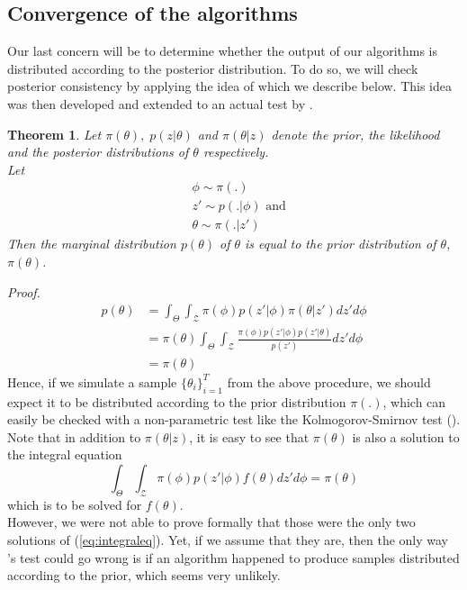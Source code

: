 \documentclass[11pt,a4paper]{report}\usepackage[]{graphicx}\usepackage[]{color}
\newtheorem{theorem}{Theorem}[section]
\begin{document}
\subsection{Convergence of the algorithms}
Our last concern will be to determine whether the output of our algorithms is distributed according to the posterior distribution. To do so, we will check posterior consistency by applying the idea of \cite{geweke2004getting} which we describe below. This idea was then developed and extended to an actual test by \cite{talts2018validating}.\\

\begin{theorem}
Let $\pi(\theta),\;p(z|\theta)$ and $\pi(\theta|z)$ denote the prior, the likelihood and the posterior distributions of $\theta$ respectively.\\
Let
\begin{align*}
&\phi\sim\pi(.)\\
&z'\sim p(.|\phi)\text{ and}\\
&\theta\sim\pi(.|z')
\end{align*}
Then the marginal distribution $p(\theta)$ of $\theta$ is equal to the prior distribution of $\theta$, $\pi(\theta)$.
\end{theorem} 

\noindent\textit{Proof.}
\begin{align}
\label{eq:geweke}
p(\theta)&=\int_{\Theta}\int_{\mathcal Z}\pi(\phi)p(z'|\phi)\pi(\theta|z')dz'd\phi\nonumber\\
&=\pi(\theta)\int_{\Theta}{\int_{\mathcal Z}{\frac{\pi(\phi)p(z'|\phi)p(z'|\theta)}{p(z')}dz'd\phi}}\nonumber\\
&=\pi(\theta)
\end{align}
Hence, if we simulate a sample $\{\theta_i\}_{i=1}^T$ from the above procedure, we should expect it to be distributed according to the prior distribution $\pi(.)$, which can easily be checked with a non-parametric test like the Kolmogorov-Smirnov test (\cite{kolmogorov1933sulla}).\\
Note that in addition to $\pi(\theta|z)$, it is easy to see that $\pi(\theta)$ is also a solution to the integral equation 
\begin{equation}
\label{eq:integraleq}
   \int_{\Theta}\int_{\mathcal Z}\pi(\phi)p(z'|\phi)f(\theta)dz'd\phi=\pi(\theta)
\end{equation}
which is to be solved for $f(\theta)$.\\ 
However, we were not able to prove formally that those were the only two solutions of (\ref{eq:integraleq}). Yet, if we assume that they are, then the only way \cite{geweke2004getting}'s test could go wrong is if an algorithm happened to produce samples distributed according to the prior, which seems very unlikely.\\
\end{document}
